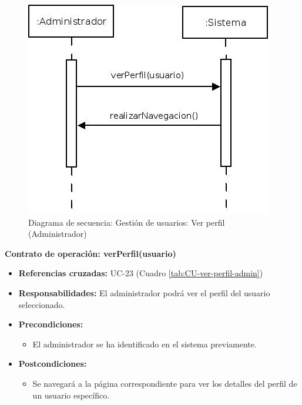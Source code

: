 \begin{figure}[h!]
\centering
  \includegraphics[scale=.55]{img/secuencias/gestion-usuarios-ver-perfil.jpeg}
  \caption{Diagrama de secuencia: Gestión de usuarios: Ver perfil (Administrador)}
  \label{fig:secuencia-gestion-usuarios-ver-perfil}
\end{figure}

\textbf{Contrato de operación: verPerfil(usuario)}
\begin{itemize}
\item \textbf{Referencias cruzadas:} UC-23 (Cuadro \ref{tab:CU-ver-perfil-admin})
\item \textbf{Responsabilidades:} El administrador podrá ver el perfil del usuario seleccionado.
\item \textbf{Precondiciones:} 
 \begin{itemize}
\item El administrador se ha identificado en el sistema previamente.
\end {itemize}
\item \textbf{Postcondiciones:} 
 \begin{itemize}
\item Se navegará a la página correspondiente para ver los detalles del perfil de un usuario específico.
\end {itemize}
\end {itemize}

